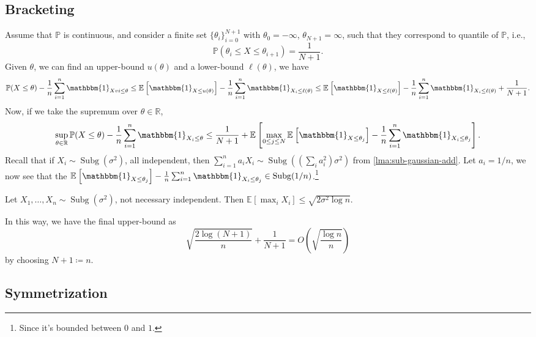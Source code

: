 \subsection{Bracketing}
Assume that \(\mathbb{P} \) is continuous, and consider a finite set \(\{ \theta _i \}_{i = 0}^{N+1} \) with \(\theta _0 = -\infty \), \(\theta _{N+1} = \infty \), such that they correspond to quantile of \(\mathbb{P} \), i.e.,
\[
	\mathbb{P} (\theta _i \leq X \leq \theta _{i+1}) = \frac{1}{N+1}.
\]
Given \(\theta \), we can find an upper-bound \(u(\theta )\) and a lower-bound \(\ell (\theta )\), we have
\[
	\mathbb{P} (X \leq \theta ) - \frac{1}{n} \sum_{i=1}^{n} \mathbbm{1}_{Xvi \leq \theta }
	\leq \mathbb{E}_{}\left[\mathbbm{1}_{X \leq u(\theta )}  \right] - \frac{1}{n}\sum_{i=1}^{n} \mathbbm{1}_{X_i \leq \ell (\theta )}
	\leq \mathbb{E}_{}\left[\mathbbm{1}_{X \leq \ell (\theta )}  \right] - \frac{1}{n}\sum_{i=1}^{n} \mathbbm{1}_{X_i \leq \ell (\theta )} + \frac{1}{N+1}.
\]
Now, if we take the supremum over \(\theta \in \mathbb{R} \),
\[
	\sup _{\theta \in \mathbb{R} } \mathbb{P} (X \leq \theta )- \frac{1}{n} \sum_{i=1}^{n} \mathbbm{1}_{X_i \leq \theta }
	\leq \frac{1}{N+1} + \mathbb{E}_{}\left[\max _{0 \leq j \leq N} \mathbb{E}_{}\left[\mathbbm{1}_{X \leq \theta _j}\right] - \frac{1}{n} \sum_{i=1}^{n} \mathbbm{1}_{X_i \leq \theta _j} \right].
\]
Recall that if \(X_i \sim \mathop{\mathrm{Subg}}(\sigma ^2) \), all independent, then \(\sum_{i=1}^{n} a_i X_i \sim \mathop{\mathrm{Subg}}((\sum_{i} a_i^2) \sigma ^2) \) from \autoref{lma:sub-gaussian-add}. Let \(a_i = 1/n\), we now see that the \(\mathbb{E}_{}\left[\mathbbm{1}_{X \leq \theta _j}\right] - \frac{1}{n} \sum_{i=1}^{n} \mathbbm{1}_{X_i \leq \theta _j} \in \mathop{\mathrm{Subg}}(1 / n) \).\footnote{Since it's bounded between \(0\) and \(1\).}

\begin{lemma}\label{lma:lec7}
	Let \(X_1, \dots , X_n \sim \mathop{\mathrm{Subg}}(\sigma ^{2} ) \), not necessary independent. Then \(\mathbb{E}_{}\left[\max _i X_i \right] \leq \sqrt{2 \sigma ^{2} \log n} \).
\end{lemma}

In this way, we have the final upper-bound as
\[
	\sqrt{\frac{2 \log (N+1)}{n}} + \frac{1}{N+1} = O\left( \sqrt{\frac{\log n}{n}}  \right)
\]
by choosing \(N+1 \coloneqq n\).

\subsection{Symmetrization}

